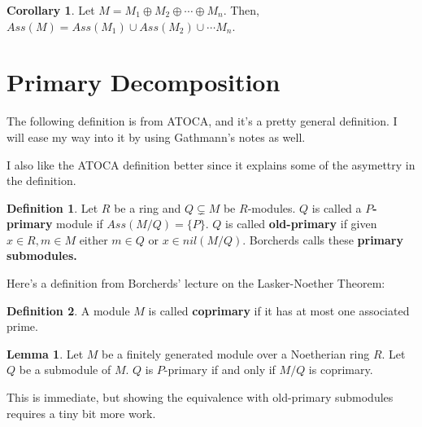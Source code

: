 \documentclass{article}
\theoremstyle{definition}
\newtheorem{definition}{Definition}
\newtheorem{lemma}[theorem]{Lemma}
\newtheorem{corollary}{Corollary}[theorem]
\begin{document}
\begin{corollary}
    Let $ M = M_{1} \oplus M_{2} \oplus \cdots \oplus M_{n} $.
    Then, $ Ass(M) = Ass(M_{1}) \cup Ass(M_{2}) \cup \cdots M_{n} $.
\end{corollary}

\newpage

\section{Primary Decomposition}

The following definition is from ATOCA, and it's a pretty general definition.
I will ease my way into it by using Gathmann's notes as well.

I also like the ATOCA definition better since it explains some of the asymettry in the definition.

\begin{definition}
    Let $ R $ be a ring and $ Q \subsetneq M $ be $ R $-modules.
    $ Q $ is called a \textbf{$P$-primary} module if $ Ass(M/Q) = \{ P \} $.
    $ Q $ is called \textbf{old-primary} if given $ x \in R , m \in M $
    either $ m \in Q $ or $ x \in nil(M/Q) $. Borcherds calls these
    \textbf{primary submodules.}
\end{definition}

Here's a definition from Borcherds' lecture on the Lasker-Noether Theorem:

\begin{definition}
    A module $ M $ is called \textbf{coprimary} if it has at most one associated prime.
\end{definition}

\begin{lemma}
    Let $ M $ be a finitely generated module over a Noetherian ring $ R $.
    Let $ Q $ be a submodule of $ M $.
    $ Q $ is $ P $-primary if and only if $ M/Q $ is coprimary.
\end{lemma}

This is immediate, but showing the equivalence with old-primary submodules requires
a tiny bit more work.
\end{document}
